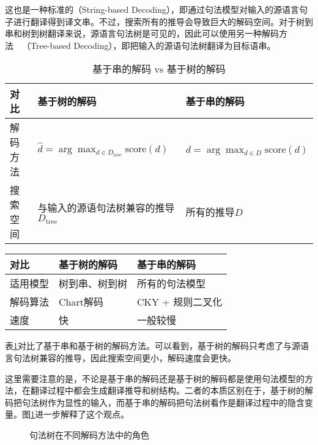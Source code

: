 \parinterval 这也是一种标准的{\small{}}（String-based Decoding），即通过句法模型对输入的源语言句子进行翻译得到译文串。不过，搜索所有的推导会导致巨大的解码空间。对于树到串和树到树翻译来说，源语言句法树是可见的，因此可以使用另一种解码方法\ \dash \ {\small{}}（Tree-based Decoding），即把输入的源语句法树翻译为目标语串。

\begin{table}[htp]{
\begin{center}
\caption{基于串的解码 vs 基于树的解码}
\label{tab:4-4}
{
\begin{tabular}{l | p{16.5em} p{12em}}
对比 & 基于树的解码 & 基于串的解码 \\
\hline
\rule{0pt}{15pt}解码方法 & $\hat{d} = \arg\max_{d \in D_{\textrm{tree}}} \textrm{score} (d)$ & $\hat{d} = \arg\max_{d \in D} \textrm{score} (d)$ \\
\rule{0pt}{15pt}搜索空间 & 与输入的源语句法树兼容的推导$D_{\textrm{tree}}$ & 所有的推导$D$ 
\end{tabular}
}
\end{center}
}\end{table}
\begin{table}[htp]{
\begin{center}
{
\begin{tabular}{l | p{16.5em} p{12em}}
对比 & 基于树的解码 & 基于串的解码 \\
\hline
\rule{0pt}{15pt}适用模型 & 树到串、树到树 & 所有的句法模型 \\
\rule{0pt}{15pt}解码算法 & Chart解码 & CKY + 规则二叉化 \\
\rule{0pt}{15pt}速度 & 快 & 一般较慢
\end{tabular}
}
\end{center}
}\end{table}

\parinterval 表\ref{tab:4-4}对比了基于串和基于树的解码方法。可以看到，基于树的解码只考虑了与源语言句法树兼容的推导，因此搜索空间更小，解码速度会更快。

\parinterval 这里需要注意的是，不论是基于串的解码还是基于树的解码都是使用句法模型的方法，在翻译过程中都会生成翻译推导和树结构。二者的本质区别在于，基于树的解码把句法树作为显性的输入，而基于串的解码把句法树看作是翻译过程中的隐含变量。图\ref{fig:4-67}进一步解释了这个观点。

\begin{figure}[htp]
\centering

\caption{句法树在不同解码方法中的角色}
\label{fig:4-67}
\end{figure}

